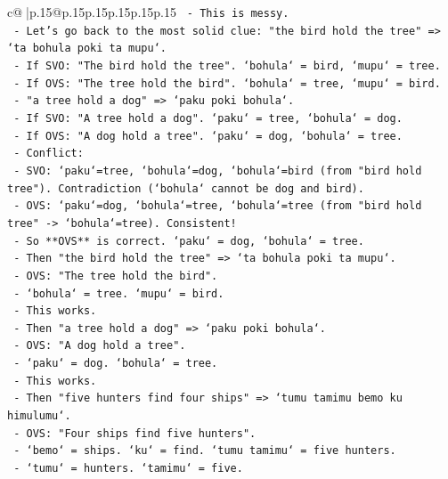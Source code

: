 \documentclass{article}
\begin{document}
{\begin{supertabular}{c@{$\;$}|p{.15\linewidth}@{}p{.15\linewidth}p{.15\linewidth}p{.15\linewidth}p{.15\linewidth}p{.15\linewidth}}
{{{\texttt{          {-} This is messy.} \\
\texttt{      {-} Let's go back to the most solid clue: "the bird hold the tree" => `ta bohula poki ta mupu`.} \\
\texttt{        {-} If SVO: "The bird hold the tree". `bohula` = bird, `mupu` = tree.} \\
\texttt{        {-} If OVS: "The tree hold the bird". `bohula` = tree, `mupu` = bird.} \\
\texttt{      {-} "a tree hold a dog" => `paku poki bohula`.} \\
\texttt{        {-} If SVO: "A tree hold a dog". `paku` = tree, `bohula` = dog.} \\
\texttt{        {-} If OVS: "A dog hold a tree". `paku` = dog, `bohula` = tree.} \\
\texttt{      {-} Conflict:} \\
\texttt{        {-} SVO: `paku`=tree, `bohula`=dog, `bohula`=bird (from "bird hold tree"). Contradiction (`bohula` cannot be dog and bird).} \\
\texttt{        {-} OVS: `paku`=dog, `bohula`=tree, `bohula`=tree (from "bird hold tree" {-}> `bohula`=tree). Consistent!} \\
\texttt{        {-} So **OVS** is correct. `paku` = dog, `bohula` = tree.} \\
\texttt{        {-} Then "the bird hold the tree" => `ta bohula poki ta mupu`.} \\
\texttt{          {-} OVS: "The tree hold the bird".} \\
\texttt{          {-} `bohula` = tree. `mupu` = bird.} \\
\texttt{          {-} This works.} \\
\texttt{        {-} Then "a tree hold a dog" => `paku poki bohula`.} \\
\texttt{          {-} OVS: "A dog hold a tree".} \\
\texttt{          {-} `paku` = dog. `bohula` = tree.} \\
\texttt{          {-} This works.} \\
\texttt{        {-} Then "five hunters find four ships" => `tumu tamimu bemo ku himulumu`.} \\
\texttt{          {-} OVS: "Four ships find five hunters".} \\
\texttt{          {-} `bemo` = ships. `ku` = find. `tumu tamimu` = five hunters.} \\
\texttt{          {-} `tumu` = hunters. `tamimu` = five.} \\
}}}
\end{supertabular}}
\end{document}
